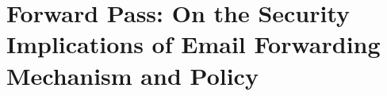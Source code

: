 \documentclass[12pt]{ucsddissertation}
\newcommand{\sword}{SwordBox}
\begin{document}
\begin{dissertationintroduction}
\end{dissertationintroduction}



\chapter{Forward Pass: On the Security Implications of Email Forwarding Mechanism and Policy}
\label{chap:swordbox}












\end{document}
